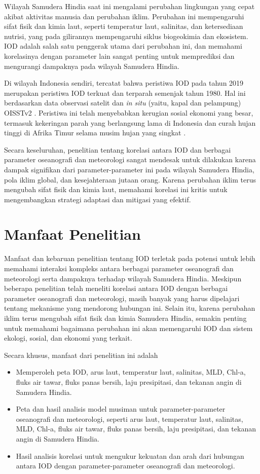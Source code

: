 \begin{spacing}{1.5}
	Wilayah Samudera Hindia saat ini mengalami perubahan lingkungan yang cepat akibat aktivitas manusia dan perubahan iklim. Perubahan ini mempengaruhi sifat fisik dan kimia laut, seperti temperatur laut, salinitas, dan ketersediaan nutrisi, yang pada gilirannya mempengaruhi siklus biogeokimia dan ekosistem. IOD adalah salah satu penggerak utama dari perubahan ini, dan memahami korelasinya dengan parameter lain sangat penting untuk memprediksi dan mengurangi dampaknya pada wilayah Samudera Hindia.
	
	Di wilayah Indonesia sendiri, tercatat bahwa peristiwa IOD pada tahun 2019 merupakan peristiwa IOD terkuat dan terparah semenjak tahun 1980. Hal ini berdasarkan data observasi satelit dan \textit{in situ} (yaitu, kapal dan pelampung) OISSTv2 \cite{Reynolds2002}. Peristiwa ini telah menyebabkan kerugian sosial ekonomi yang besar, termasuk kekeringan parah yang berlangsung lama di Indonesia dan curah hujan tinggi di Afrika Timur selama musim hujan yang singkat \cite{Bo2020}.
	
	Secara keseluruhan, penelitian tentang korelasi antara IOD dan berbagai parameter oseanografi dan meteorologi sangat mendesak untuk dilakukan karena dampak signifikan dari parameter-parameter ini pada wilayah Samudera Hindia, pola iklim global, dan kesejahteraan jutaan orang. Karena perubahan iklim terus mengubah sifat fisik dan kimia laut, memahami korelasi ini kritis untuk mengembangkan strategi adaptasi dan mitigasi yang efektif.
	\section[Manfaat Penelitian]{Manfaat Penelitian}
	
	Manfaat dan kebaruan penelitian tentang IOD terletak pada potensi untuk lebih memahami interaksi kompleks antara berbagai parameter oseanografi dan meteorologi serta dampaknya terhadap wilayah Samudera Hindia. Meskipun beberapa penelitian telah meneliti korelasi antara IOD dengan berbagai parameter oseanografi dan meteorologi, masih banyak yang harus dipelajari tentang mekanisme yang mendorong hubungan ini.
	Selain itu, karena perubahan iklim terus mengubah sifat fisik dan kimia Samudera Hindia, semakin penting untuk memahami bagaimana perubahan ini akan memengaruhi IOD dan sistem ekologi, sosial, dan ekonomi yang terkait. 
	
	Secara khusus, manfaat dari penelitian ini adalah
	\begin{itemize}
		\item Memperoleh peta IOD, arus laut, temperatur laut, salinitas, MLD, Chl-a, fluks air tawar, fluks panas bersih, laju presipitasi, dan tekanan angin di Samudera Hindia.
		\item Peta dan hasil analisis model musiman untuk parameter-parameter oseanografi dan meteorologi, seperti arus laut, temperatur laut, salinitas, MLD, Chl-a, fluks air tawar, fluks panas bersih, laju presipitasi, dan tekanan angin di Samudera Hindia.
		\item Hasil analisis korelasi untuk mengukur kekuatan dan arah dari hubungan antara IOD dengan parameter-parameter oseanografi dan meteorologi.
	\end{itemize}
	

\end{spacing}
